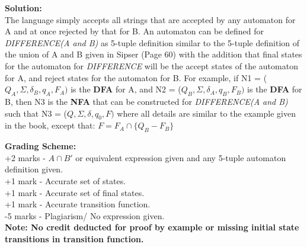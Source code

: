 \documentclass[11pt, article, oneside]{memoir}
\begin{document}
\begin{enumerate}
        \textbf{Solution:}
        \\The language simply accepts all strings that are accepted by any automaton for A and at once rejected by that for B. An automaton can be defined  for \textit{DIFFERENCE(A and B)} as 5-tuple definition similar to the 5-tuple definition of the union of A and B given in Sipser (Page 60) with the addition that final states for the automaton for \textit{DIFFERENCE} will be the accept states of the automaton for A, and reject states for the automaton for B. For example, if N1 = (\(Q_A, \Sigma, \delta_B, q_A, F_A)\) is the \textbf{DFA} for A, and N2 = (\(Q_B, \Sigma, \delta_A, q_B, F_B)\) is the \textbf{DFA} for B, then N3 is the \textbf{NFA} that can be constructed for \textit{DIFFERENCE(A and B)} such that N3 = (\(Q, \Sigma, \delta, q_0, F)\) where all details are similar to the example given in the book, except that: \( F = F_A \cap \{Q_B - F_B\} \)

        \textbf{Grading Scheme:}
        \\+2 marks - \(A \cap B'\) or equivalent expression given and any 5-tuple automaton definition given.
        \\+1 mark - Accurate set of states.
        \\+1 mark - Accurate set of final states.
        \\+1 mark - Accurate transition function.
        \\-5 marks -  Plagiarism/ No expression given.
        \\\textbf{Note: No credit deducted for proof by example or missing initial state transitions in transition function.}
        
\end{enumerate}






\end{document}
